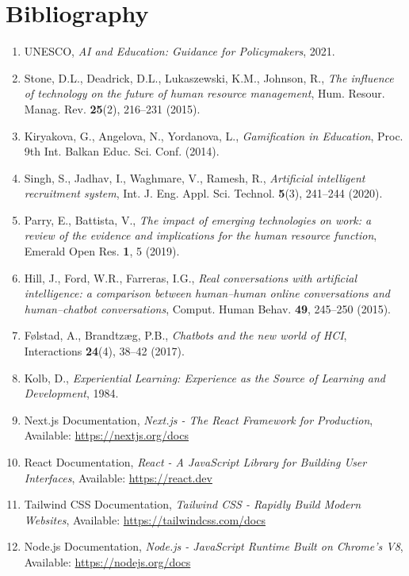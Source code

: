 \documentclass[12pt,a4paper]{report}
\begin{document}
\newpage
\chapter*{Bibliography}

\begin{enumerate}
    \item UNESCO, \textit{AI and Education: Guidance for Policymakers}, 2021.
    \item Stone, D.L., Deadrick, D.L., Lukaszewski, K.M., Johnson, R., \textit{The influence of technology on the future of human resource management}, Hum. Resour. Manag. Rev. \textbf{25}(2), 216--231 (2015).
    \item Kiryakova, G., Angelova, N., Yordanova, L., \textit{Gamification in Education}, Proc. 9th Int. Balkan Educ. Sci. Conf. (2014).
    \item Singh, S., Jadhav, I., Waghmare, V., Ramesh, R., \textit{Artificial intelligent recruitment system}, Int. J. Eng. Appl. Sci. Technol. \textbf{5}(3), 241--244 (2020).
    \item Parry, E., Battista, V., \textit{The impact of emerging technologies on work: a review of the evidence and implications for the human resource function}, Emerald Open Res. \textbf{1}, 5 (2019).
    \item Hill, J., Ford, W.R., Farreras, I.G., \textit{Real conversations with artificial intelligence: a comparison between human--human online conversations and human--chatbot conversations}, Comput. Human Behav. \textbf{49}, 245--250 (2015).
    \item F{\o}lstad, A., Brandtz{\ae}g, P.B., \textit{Chatbots and the new world of HCI}, Interactions \textbf{24}(4), 38--42 (2017).
    \item Kolb, D., \textit{Experiential Learning: Experience as the Source of Learning and Development}, 1984.
    \item Next.js Documentation, \textit{Next.js - The React Framework for Production}, Available: \url{https://nextjs.org/docs}
    \item React Documentation, \textit{React - A JavaScript Library for Building User Interfaces}, Available: \url{https://react.dev}
    \item Tailwind CSS Documentation, \textit{Tailwind CSS - Rapidly Build Modern Websites}, Available: \url{https://tailwindcss.com/docs}
    \item Node.js Documentation, \textit{Node.js - JavaScript Runtime Built on Chrome's V8}, Available: \url{https://nodejs.org/docs}

\end{enumerate}
\end{document}
